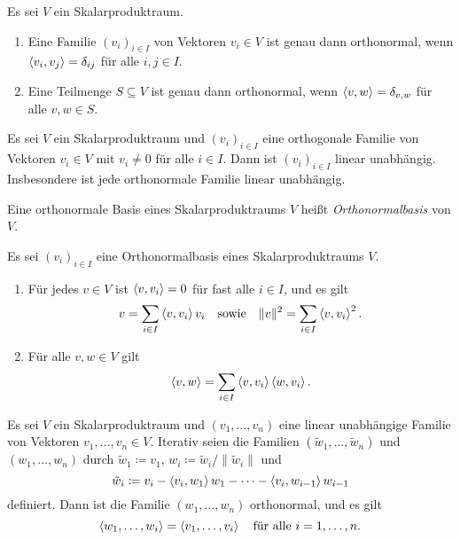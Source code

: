 \begin{lemma}
  Es sei $V$ ein Skalarproduktraum.
  \begin{enumerate}[leftmargin=*]
    \item
      Eine Familie $(v_i)_{i \in I}$ von Vektoren $v_i \in V$ ist genau dann orthonormal, wenn $\left\langle v_i, v_j \right\rangle = \delta_{ij}$ für alle $i,j \in I$.
    \item
      Eine Teilmenge $S \subseteq V$ ist genau dann orthonormal, wenn $\left\langle v, w \right\rangle = \delta_{v,w}$ für alle $v, w \in S$.
  \end{enumerate}  
\end{lemma}


\begin{lemma}
  Es sei $V$ ein Skalarproduktraum und $(v_i)_{i \in I}$ eine orthogonale Familie von Vektoren $v_i \in V$ mit $v_i \neq 0$ für alle $i \in I$.
  Dann ist $(v_i)_{i \in I}$ linear unabhängig.
  Insbesondere ist jede orthonormale Familie linear unabhängig.
\end{lemma}


\begin{definition}
  Eine orthonormale Basis eines Skalarproduktraums $V$ heißt \emph{Orthonormalbasis} von $V$.
\end{definition}


\begin{proposition}
  Es sei $(v_i)_{i \in I}$ eine Orthonormalbasis eines Skalarproduktraums $V$.
  \begin{enumerate}
    \item
      Für jedes $v \in V$ ist $\left\langle v, v_i \right\rangle = 0$ für fast alle $i \in I$, und es gilt
      \begin{gather*}
        v = \sum_{i \in I} \left\langle v, v_i \right\rangle v_i
      \quad\text{sowie}\quad
        \|v\|^2 = \sum_{i \in I} \left\langle v, v_i \right\rangle^2.
      \end{gather*}
    \item
      Für alle $v, w \in V$ gilt
      \[
        \left\langle v, w \right\rangle
        = \sum_{i \in I} \left\langle v, v_i \right\rangle \left\langle w, v_i \right\rangle.
      \]
  \end{enumerate}
\end{proposition}


\begin{theorem}
  Es sei $V$ ein Skalarproduktraum und $(v_1, \dotsc, v_n)$ eine linear unabhängige Familie von Vektoren $v_1, \dotsc, v_n \in V$.
  Iterativ seien die Familien $(\tilde{w}_1, \dotsc, \tilde{w}_n)$ und $(w_1, \dotsc, w_n)$ durch
  $\tilde{w}_1 \coloneqq v_1$, $w_i \coloneqq \tilde{w}_i/\|\tilde{w}_i\|$ und
  \[
    \tilde{w}_i \coloneqq v_i - \left\langle v_i, w_1 \right\rangle w_1 - \dotsb - \left\langle v_i, w_{i-1} \right\rangle w_{i-1}
  \]
  definiert.
  Dann ist die Familie $(w_1, \dotsc, w_n)$ orthonormal, und es gilt
  \[
    \left\langle w_1, \dotsc, w_i \right\rangle = \left\langle v_1, \dotsc, v_i \right\rangle
    \quad
    \text{für alle $i = 1, \dotsc, n$}.
  \]
\end{theorem}


